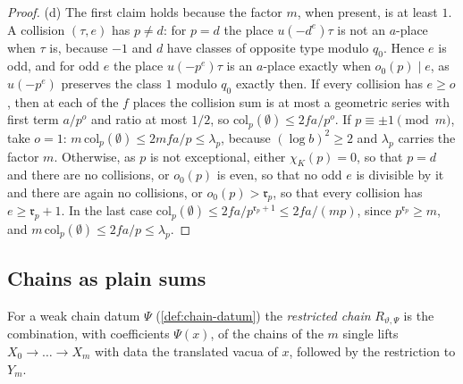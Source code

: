 \begin{proof}
(d) The first claim holds because the factor $m$, when present, is at least $1$. A collision $(\tau,e)$ has $p\ne d$: for $p=d$ the place $u(-d^e)\tau$ is not an $a$-place when $\tau$ is, because $-1$ and $d$ have classes of opposite type modulo $q_0$. Hence $e$ is odd, and for odd $e$ the place $u(-p^e)\tau$ is an $a$-place exactly when $o_0(p)\mid e$, as
$u(-p^e)$ preserves the class $1$ modulo $q_0$ exactly then. If every collision has $e\ge o$, then at each of the $f$ places the collision sum is at most a geometric series with first term $a/p^o$ and ratio at most $1/2$, so $\mathrm{col}_p(\emptyset)\le2fa/p^o$. If $p\equiv\pm1\pmod m$, take $o=1$: $m\,\mathrm{col}_p(\emptyset)\le2mfa/p\le\lambda_p$, because $(\log b)^2\ge2$
and $\lambda_p$ carries the factor $m$. Otherwise, as $p$ is not exceptional, either $\chi_K(p)=0$, so that $p=d$ and there are no collisions, or $o_0(p)$ is even, so that no odd $e$ is divisible by it and there are again no collisions, or $o_0(p)>\mathfrak r_p$, so that every collision has $e\ge\mathfrak r_p+1$. In the last case $\mathrm{col}_p(\emptyset)\le2fa/p^{\mathfrak r_p+1}\le2fa/(mp)$,
since $p^{\mathfrak r_p}\ge m$, and $m\,\mathrm{col}_p(\emptyset)\le2fa/p\le\lambda_p$.
\end{proof}

\subsection{Chains as plain sums}\label{ss:chains-plain}
For a weak chain datum $\Psi$ (\cref{def:chain-datum}) the \emph{restricted chain} $R_{\vartheta,\Psi}$ is the combination, with
coefficients $\Psi(x)$, of the chains of the $m$ single lifts $X_0\to\dots\to X_m$ with data the translated vacua of $x$, followed by
the restriction to $Y_m$.

